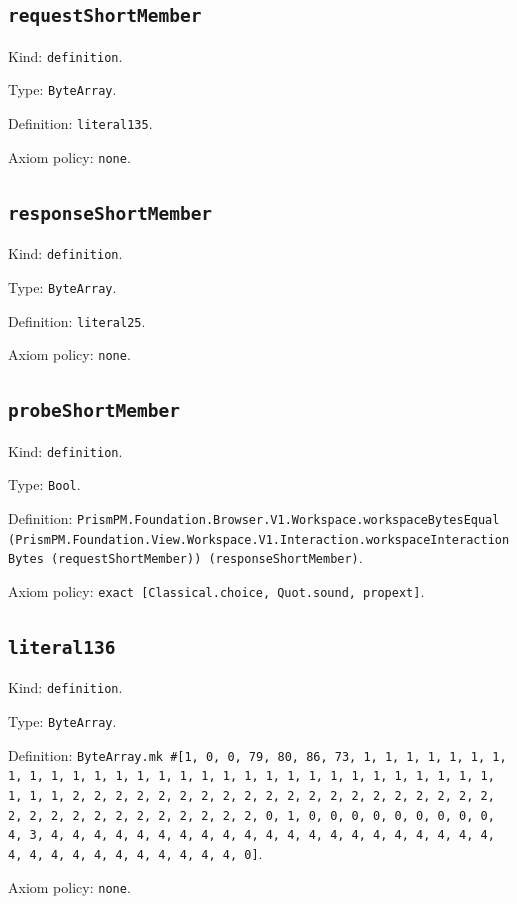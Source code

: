 \documentclass[11pt]{article}
\begin{document}
\subsection*{\texttt{requestShortMember}}
\noindent Kind: \texttt{definition}.\par
\noindent Type: \texttt{ByteArray}.\par
\noindent Definition: \texttt{literal135}.\par
\noindent Axiom policy: \texttt{none}.\par
\subsection*{\texttt{responseShortMember}}
\noindent Kind: \texttt{definition}.\par
\noindent Type: \texttt{ByteArray}.\par
\noindent Definition: \texttt{literal25}.\par
\noindent Axiom policy: \texttt{none}.\par
\subsection*{\texttt{probeShortMember}}
\noindent Kind: \texttt{definition}.\par
\noindent Type: \texttt{Bool}.\par
\noindent Definition: \texttt{PrismPM.Foundation.Browser.V1.Workspace.workspaceBytesEqual (PrismPM.Foundation.View.Workspace.V1.Interaction.workspaceInteractionBytes (requestShortMember)) (responseShortMember)}.\par
\noindent Axiom policy: \texttt{exact [Classical.choice, Quot.sound, propext]}.\par
\subsection*{\texttt{literal136}}
\noindent Kind: \texttt{definition}.\par
\noindent Type: \texttt{ByteArray}.\par
\noindent Definition: \texttt{ByteArray.mk \#[1, 0, 0, 79, 80, 86, 73, 1, 1, 1, 1, 1, 1, 1, 1, 1, 1, 1, 1, 1, 1, 1, 1, 1, 1, 1, 1, 1, 1, 1, 1, 1, 1, 1, 1, 1, 1, 1, 1, 1, 2, 2, 2, 2, 2, 2, 2, 2, 2, 2, 2, 2, 2, 2, 2, 2, 2, 2, 2, 2, 2, 2, 2, 2, 2, 2, 2, 2, 2, 2, 2, 2, 0, 1, 0, 0, 0, 0, 0, 0, 0, 0, 0, 4, 3, 4, 4, 4, 4, 4, 4, 4, 4, 4, 4, 4, 4, 4, 4, 4, 4, 4, 4, 4, 4, 4, 4, 4, 4, 4, 4, 4, 4, 4, 4, 4, 4, 0]}.\par
\noindent Axiom policy: \texttt{none}.\par
\end{document}
